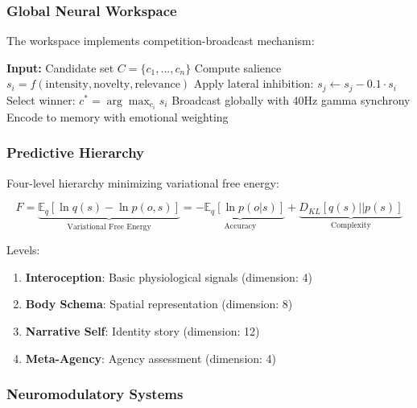\documentclass[twocolumn,10pt]{article}
\begin{document}
\subsubsection{Global Neural Workspace}

The workspace implements competition-broadcast mechanism:

\begin{algorithm}
\caption{Workspace Selection}\label{alg:workspace}
\begin{algorithmic}[1]
\State \textbf{Input:} Candidate set $C = \{c_1, ..., c_n\}$
    \State Compute salience $s_i = f(\text{intensity}, \text{novelty}, \text{relevance})$
\EndFor
{}
        \State Apply lateral inhibition: $s_j \leftarrow s_j - 0.1 \cdot s_i$
    \EndFor
\EndWhile
\State Select winner: $c^* = \arg\max_{c_i} s_i$
    \State Broadcast globally with 40Hz gamma synchrony
    \State Encode to memory with emotional weighting
\EndIf
\end{algorithmic}
\end{algorithm}

\subsubsection{Predictive Hierarchy}

Four-level hierarchy minimizing variational free energy:

\begin{equation}
F = \underbrace{\mathbb{E}_{q}[\ln q(s) - \ln p(o,s)]}_{\text{Variational Free Energy}}
= \underbrace{-\mathbb{E}_{q}[\ln p(o|s)]}_{\text{Accuracy}} + \underbrace{D_{KL}[q(s)||p(s)]}_{\text{Complexity}}
\end{equation}

Levels:
\begin{enumerate}
    \item \textbf{Interoception}: Basic physiological signals (dimension: 4)
    \item \textbf{Body Schema}: Spatial representation (dimension: 8)
    \item \textbf{Narrative Self}: Identity story (dimension: 12)
    \item \textbf{Meta-Agency}: Agency assessment (dimension: 4)
\end{enumerate}

\subsubsection{Neuromodulatory Systems}
\end{document}
